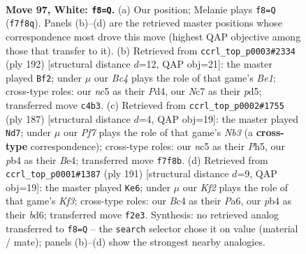 \documentclass[11pt]{article}
\begin{document}
\clearpage

\begin{figure}[p]\centering
\begin{subfigure}{0.46\textwidth}\centering
\resizebox{\linewidth}{!}{%
\newchessgame
\chessboard[
  setfen={8/2N2P1b/8/2n5/1pB3Pk/8/5K2/8 w - - 0 97},
  showmover=false,
  pgfstyle=straightmove, color=movearrow, markmove={f7-f8}
]}
\caption{}
\end{subfigure}\hfill
\begin{subfigure}{0.46\textwidth}\centering
\resizebox{\linewidth}{!}{%
\newchessgame
\chessboard[
  setfen={4b3/8/p6K/P2pPk2/3P4/8/8/4B3 w - - 0 97},
  showmover=false,
  pgfstyle=straightmove, color=movearrow, markmove={e1-f2}
]}
\caption{}
\end{subfigure}
\\[4pt]
\begin{subfigure}{0.46\textwidth}\centering
\resizebox{\linewidth}{!}{%
\newchessgame
\chessboard[
  setfen={8/5k2/Bn6/7p/4bB1P/8/6p1/6K1 b - - 3 94},
  showmover=false,
  pgfstyle=straightmove, color=movearrow, markmove={b6-d7}
]}
\caption{}
\end{subfigure}\hfill
\begin{subfigure}{0.46\textwidth}\centering
\resizebox{\linewidth}{!}{%
\newchessgame
\chessboard[
  setfen={8/8/p2B1k2/P6p/7K/5b2/8/8 b - - 25 96},
  showmover=false,
  pgfstyle=straightmove, color=movearrow, markmove={f6-e6}
]}
\caption{}
\end{subfigure}
\caption{\textbf{Move 97, White: \texttt{f8=Q}.} (a) Our position; Melanie plays \texttt{f8=Q} (\texttt{f7f8q}). Panels (b)--(d) are the retrieved master positions whose correspondence most drove this move (highest QAP objective among those that transfer to it). (b) Retrieved from \texttt{ccrl\_top\_p0003\#2334} (ply 192) [structural distance $d$=12, QAP obj=21]: the master played \texttt{Bf2}; under $\mu$ our \emph{Bc4} plays the role of that game's \emph{Be1}; cross-type roles: our \emph{n}c5 as their \emph{P}d4, our \emph{N}c7 as their \emph{p}d5; transferred move \texttt{c4b3}. (c) Retrieved from \texttt{ccrl\_top\_p0002\#1755} (ply 187) [structural distance $d$=4, QAP obj=19]: the master played \texttt{Nd7}; under $\mu$ our \emph{Pf7} plays the role of that game's \emph{Nb3} (a \textbf{cross-type} correspondence); cross-type roles: our \emph{n}c5 as their \emph{P}h5, our \emph{p}b4 as their \emph{B}e4; transferred move \texttt{f7f8b}. (d) Retrieved from \texttt{ccrl\_top\_p0001\#1387} (ply 191) [structural distance $d$=9, QAP obj=19]: the master played \texttt{Ke6}; under $\mu$ our \emph{Kf2} plays the role of that game's \emph{Kf3}; cross-type roles: our \emph{B}c4 as their \emph{P}a6, our \emph{p}b4 as their \emph{b}d6; transferred move \texttt{f2e3}. Synthesis: no retrieved analog transferred to \texttt{f8=Q} -- the \texttt{search} selector chose it on value (material / mate); panels (b)--(d) show the strongest nearby analogies.}
\label{fig:thought-m192}
\end{figure}
\end{document}
